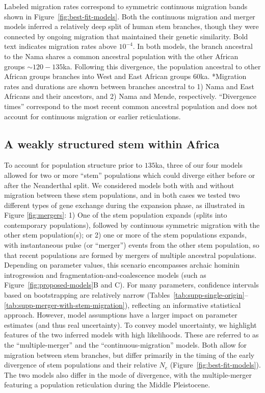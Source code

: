 \documentclass[]{article}
\begin{document}
\begin{table}[t!]
{        Labeled migration rates correspond to symmetric continuous migration
        bands shown in Figure~\ref{fig:best-fit-models}. Both the continuous migration and
        merger models inferred a relatively deep split of human stem branches,
        though they were connected by ongoing migration that maintained their
        genetic similarity. Bold text indicates migration rates above $10^{-4}$.
        In both models, the branch ancestral to the Nama shares a common ancestral population
        with the other African groups $\sim120-135$ka. Following this divergence,
        the population ancestral to other African groups branches into West and East African
        groups $60$ka.
        *Migration rates and durations are shown between branches ancestral to 
        1) Nama and East Africans and their ancestors, and
        2) Nama and Mende, respectively.
        ``Divergence times'' correspond to the most recent common ancestral population
        and does not account for continuous migration or earlier reticulations.
    }
    \label{tab:migration-rates}
\end{table}

\subsection*{A weakly structured stem within Africa}

To account for population structure prior to $135$ka, three of our four models
allowed for two or more ``stem'' populations which could diverge either before
or after the Neanderthal split. We considered models both with and without
migration between these stem populations, and in both cases we tested two
different types of gene exchange during the expansion phase, as illustrated in
Figure \ref{fig:mergers}: 1) One of the stem population expands (splits into
contemporary populations), followed by continuous symmetric migration with the
other stem population(s); or 2) one or more of the stem populations expands,
with instantaneous pulse (or ``merger'') events from the other stem population,
so that recent populations are formed by mergers of multiple ancestral
populations. Depending on parameter values, this scenario encompasses archaic
hominin introgression and fragmentation-and-coalescence models (such as
Figure~\ref{fig:proposed-models}B and C). For many parameters, confidence
intervals based on bootstrapping are relatively narrow
(Tables~\ref{tab:supp-single-origin}--\ref{tab:supp-merger-with-stem-migration}),
reflecting an informative statistical approach. However, model assumptions have
a larger impact on parameter estimates (and thus real uncertainty).  To convey
model uncertainty, we highlight features of the two inferred models with high
likelihoods. These are referred to as the ``multiple-merger'' and the
``continuous-migration'' models. Both allow for migration between stem
branches, but differ primarily in the timing of the early divergence of stem
populations and their relative $N_e$ (Figure~\ref{fig:best-fit-models}). The
two models also differ in the mode of divergence, with the multiple-merger
featuring a population reticulation during the Middle Pleistocene.
\end{document}
